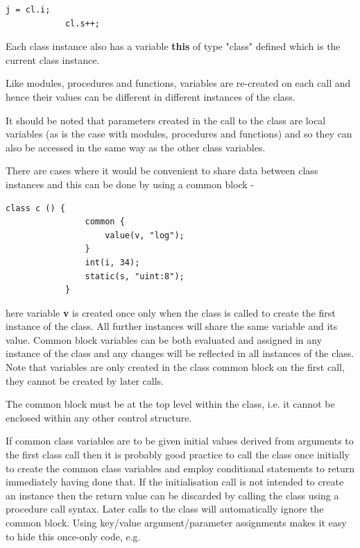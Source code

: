         \begin{lstlisting}[gobble=8, language=threepl]
            j = cl.i;
            cl.s++;
        \end{lstlisting}
        
        Each class instance also has a variable {\bf this} of type "class"
        defined which is the current class instance. 
        
        Like modules, procedures and functions, variables are re-created on
        each call and hence their values can be different in different instances
        of the class.
        
        It should be noted that parameters created in the call to the class are
        local variables (as is the case with modules, procedures and functions)
        and so they can also be accessed in the same way as the other class
        variables.
        
        There are cases where it would be convenient to share data between class
        instances and this can be done by using a common block -

        \begin{lstlisting}[gobble=8, language=threepl]
            class c () {
                common {
                    value(v, "log");
                }
                int(i, 34);
                static(s, "uint:8");
            }
        \end{lstlisting}
        
        here variable {\bf v} is created once only when the class is called to
        create the first instance of the class. All further instances will share
        the same variable and its value. Common block variables can be both
        evaluated and assigned in any instance of the class and any changes will
        be reflected in all instances of the class. Note that variables are
        only created in the class common block on the first call, they cannot
        be created by later calls.
        
        The common block must be at the top level within the class, i.e. it
        cannot be enclosed within any other control structure.
        
        If common class variables are to be given initial values derived from
        arguments to the first class call then it is probably good practice to
        call the class once initially to create the common class variables and
        employ conditional statements to return immediately having done that. If
        the initialisation call is not intended to create an instance then the
        return value can be discarded by calling the class using a procedure call
        syntax. Later calls to the class will automatically ignore the common
        block. Using key/value argument/parameter assignments makes it easy to
        hide this once-only code, e.g.
        
